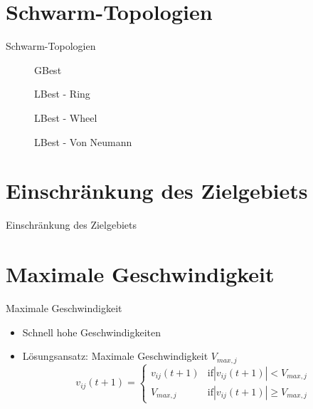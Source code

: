 \section{Schwarm-Topologien}
\begin{frame}{Schwarm-Topologien}
	\begin{figure}[htbp]
		\centering
		\begin{minipage}{4cm}
			\centering
			
			GBest
		\end{minipage}
		\begin{minipage}{4cm}
			\centering
			
			LBest - Ring
		\end{minipage}
		\begin{minipage}{4cm}
			\centering
			
			LBest - Wheel
		\end{minipage}
		\begin{minipage}{4cm}
			\centering
			
			LBest - Von Neumann
		\end{minipage}
	\end{figure}		
\end{frame}

\section[Zielgebiet]{Einschränkung des Zielgebiets}
\begin{frame}{Einschränkung des Zielgebiets}
	
\end{frame}

\section[Geschwindigkeit]{Maximale Geschwindigkeit}
\begin{frame}{Maximale Geschwindigkeit}
	\begin{itemize}
		\item Schnell hohe Geschwindigkeiten
		\item Lösungsansatz: Maximale Geschwindigkeit $V_{max,j}$
			\begin{equation*}
				v_{ij}(t+1) = 
				\begin{cases}
					v_{ij}(t+1) & \text{if} |v_{ij}(t+1)| < V_{max,j} \\
					V_{max,j} & \text{if} |v_{ij}(t+1)| \geq V_{max,j}
				\end{cases}
			\end{equation*} 
	\end{itemize}
\end{frame}

